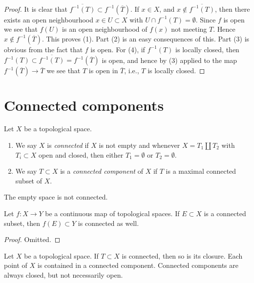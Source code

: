 \begin{proof}
It is clear that $\overline{f^{-1}(T)} \subset f^{-1}(\overline{T})$.
If $x \in X$, and $x \not \in \overline{f^{-1}(T)}$, then there
exists an open neighbourhood $x \in U \subset X$ with
$U \cap f^{-1}(T) = \emptyset$. Since $f$ is open we see that
$f(U)$ is an open neighbourhood of $f(x)$ not meeting $T$.
Hence $x \not \in f^{-1}(\overline{T})$. This proves (1).
Part (2) is an easy consequences of this.
Part (3) is obvious from the fact that $f$ is open.
For (4), if $f^{-1}(T)$
is locally closed, then
$f^{-1}(T) \subset \overline{f^{-1}(T)} = f^{-1}(\overline{T})$
is open, and hence by (3) applied to the map
$f^{-1}(\overline{T}) \to \overline{T}$ we see that
$T$ is open in $\overline{T}$, i.e., $T$ is locally closed.
\end{proof}









\section{Connected components}
\label{section-connected-components}

\begin{definition}
\label{definition-connected-components}
Let $X$ be a topological space.
\begin{enumerate}
\item We say $X$ is {\it connected} if $X$ is not empty and whenever
$X = T_1 \coprod T_2$ with $T_i \subset X$ open and closed, then either
$T_1 = \emptyset$ or $T_2 = \emptyset$.
\item We say $T \subset X$ is a {\it connected component} of $X$ if
$T$ is a maximal connected subset of $X$.
\end{enumerate}
\end{definition}

\noindent
The empty space is not connected.

\begin{lemma}
\label{lemma-image-connected-space}
Let $f : X \to Y$ be a continuous map of topological spaces.
If $E \subset X$ is a connected subset, then $f(E) \subset Y$
is connected as well.
\end{lemma}

\begin{proof}
Omitted.
\end{proof}

\begin{lemma}
\label{lemma-connected-components}
Let $X$ be a topological space. If $T \subset X$ is connected,
then so is its closure. Each point of $X$ is contained
in a connected component. Connected components are always closed,
but not necessarily open.
\end{lemma}

